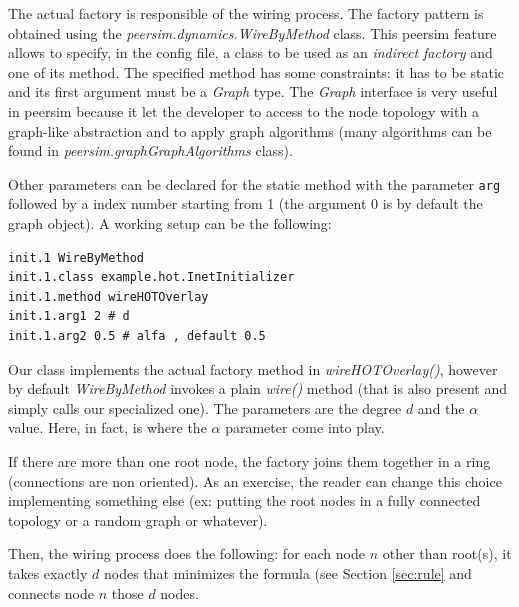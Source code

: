 \documentclass[a4paper,12pt]{article}
\begin{document}
The actual factory is responsible of the wiring process. The factory pattern
is obtained using the \emph{peersim.dynamics.WireByMethod} class. This
peersim feature allows to specify, in the config file, a class to be used
as an \emph{indirect factory} and one of its method. The specified
method has some constraints: it has to be static and its first
argument must be a \emph{Graph} type. The \emph{Graph} interface is
very useful in peersim because it let the developer to access to the node
topology with a graph-like abstraction and to apply graph algorithms
(many algorithms can be found in \emph{peersim.graphGraphAlgorithms}
class).

Other parameters can be declared for the static method with the
parameter \texttt{arg} followed by a index number starting from 1 (the
argument 0 is by default the graph object). A working setup can be
the following:

\footnotesize
\begin{verbatim}
init.1 WireByMethod
init.1.class example.hot.InetInitializer
init.1.method wireHOTOverlay
init.1.arg1 2 # d
init.1.arg2 0.5 # alfa , default 0.5 
\end{verbatim}
\normalsize

Our class implements the actual factory method in
\emph{wireHOTOverlay()}, however by default \emph{WireByMethod} invokes
a plain \emph{wire()} method (that is also present and simply calls
our specialized one). The parameters are the degree $d$
and the $\alpha$ value. Here, in fact, is where the $\alpha$ parameter
come into play.

If there are more than one root node, the factory  
joins them together in a ring (connections are non oriented). As an exercise, 
the reader can change this choice implementing something else (ex: putting 
the root nodes in a fully connected topology or a random graph or
whatever).

Then, the wiring process does the following: for each node $n$ other than
root(s), it takes exactly $d$ nodes that minimizes the formula (see
Section \ref{sec:rule} and connects node $n$ those $d$ nodes.
\end{document}
